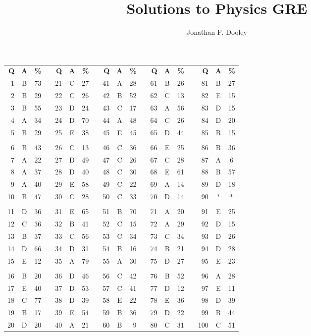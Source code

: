 \documentclass[12pt]{article}
\title{Solutions to \Year Physics GRE}
\author{Jonathan F. Dooley}
\newcommand{\Year}{1996}
\newcommand{\Ident}{GR9677}
\newcommand{\Version}{2.0}
\begin{document}
\TitlePage{\Year}{\Ident}{\Version}

\begin{table}
\centering
\begin{tabular}{rcrc rcrc rcrc rcrc rcc}
\textbf{Q} & \textbf{A} & \textbf{\%} &&
\textbf{Q} & \textbf{A} & \textbf{\%} &&
\textbf{Q} & \textbf{A} & \textbf{\%} &&
\textbf{Q} & \textbf{A} & \textbf{\%} &&
\textbf{Q} & \textbf{A} & \textbf{\%} \\
1  & B & 73 && 21 & C & 27 && 41 & A & 28 && 61 & B & 26 && 81  & B  & 27  \\
2  & B & 29 && 22 & C & 26 && 42 & B & 52 && 62 & C & 13 && 82  & E  & 15  \\
3  & B & 55 && 23 & D & 24 && 43 & C & 17 && 63 & A & 56 && 83  & D  & 15  \\
4  & A & 34 && 24 & D & 70 && 44 & A & 48 && 64 & C & 26 && 84  & D  & 20  \\
5  & B & 29 && 25 & E & 38 && 45 & E & 45 && 65 & D & 44 && 85  & B  & 15  \\
   &   &    &&    &   &    &&    &   &    &&    &   &    &&     &    &     \\
6  & B & 43 && 26 & C & 13 && 46 & C & 36 && 66 & E & 25 && 86  & B  & 36  \\
7  & A & 22 && 27 & D & 49 && 47 & C & 26 && 67 & C & 28 && 87  & A  & 6   \\
8  & A & 37 && 28 & D & 40 && 48 & C & 30 && 68 & E & 61 && 88  & B  & 57  \\
9  & A & 40 && 29 & E & 58 && 49 & C & 22 && 69 & A & 14 && 89  & D  & 18  \\
10 & B & 47 && 30 & C & 28 && 50 & C & 33 && 70 & D & 14 && 90  & $\ast$ & $\ast$   \\
   &   &    &&    &   &    &&    &   &    &&    &   &    &&     &    &     \\
11 & D & 36 && 31 & E & 65 && 51 & B & 70 && 71 & A & 20 && 91  & E  & 25  \\
12 & C & 36 && 32 & B & 41 && 52 & C & 15 && 72 & A & 29 && 92  & D  & 15  \\
13 & B & 37 && 33 & C & 56 && 53 & C & 34 && 73 & C & 34 && 93  & D  & 26  \\
14 & D & 66 && 34 & D & 31 && 54 & B & 16 && 74 & B & 21 && 94  & D  & 28  \\
15 & E & 12 && 35 & A & 79 && 55 & A & 30 && 75 & D & 27 && 95  & E  & 23  \\
   &   &    &&    &   &    &&    &   &    &&    &   &    &&     &    &     \\
16 & B & 20 && 36 & D & 46 && 56 & C & 42 && 76 & B & 52 && 96  & A  & 28  \\
17 & E & 40 && 37 & D & 53 && 57 & C & 41 && 77 & D & 12 && 97  & E  & 11  \\
18 & C & 77 && 38 & D & 39 && 58 & E & 22 && 78 & E & 36 && 98  & D  & 39  \\
19 & B & 17 && 39 & E & 54 && 59 & B & 36 && 79 & D & 22 && 99  & B  & 44  \\
20 & D & 20 && 40 & A & 21 && 60 & B & 9  && 80 & C & 31 && 100 & C  & 51
\end{tabular}
\end{table}
\end{document}
